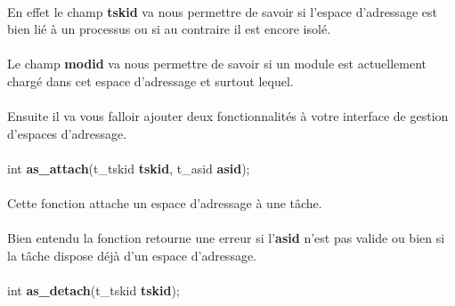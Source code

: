 \documentclass[10pt,a4wide]{article}
\begin{document}
\paragraph{}

En effet le champ \textbf{tskid} va nous permettre de savoir si l'espace
d'adressage est bien li\'e \`a un processus ou si au contraire il est encore
isol\'e.

\paragraph{}

Le champ \textbf{modid} va nous permettre de savoir si un module est
actuellement charg\'e dans cet espace d'adressage et surtout lequel.

\paragraph{}

Ensuite il va vous falloir ajouter deux fonctionnalit\'es \`a votre
interface de gestion d'espaces d'adressage.

\paragraph{}

\hspace{1.5cm}int \textbf{as\_attach}(t\_tskid \textbf{tskid},
                                      t\_asid \textbf{asid});

\paragraph{}

Cette fonction attache un espace d'adressage \`a une t\^ache.

\paragraph{}

Bien entendu la fonction retourne une erreur si l'\textbf{asid} n'est
pas valide ou bien si la t\^ache dispose d\'ej\`a d'un espace
d'adressage.

\paragraph{}

\hspace{1.5cm}int \textbf{as\_detach}(t\_tskid \textbf{tskid});
\end{document}
